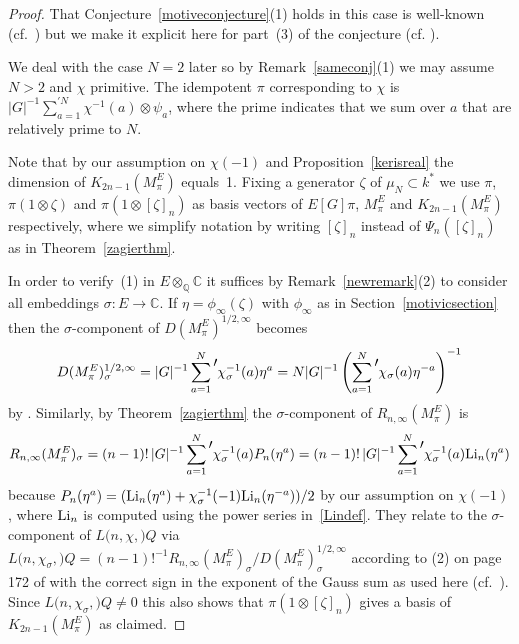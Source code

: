 \documentclass{amsart}
\begin{document}
\begin{proof}
That Conjecture~\ref{motiveconjecture}(1) holds in this case is well-known (cf.\ \cite{Neu88})
but we make it explicit here for part~(3) of the conjecture
(cf. \cite[Proposition~3.1]{Gro94}).

We deal with the case $ N=2 $ later so by Remark~\ref{sameconj}(1) we may assume $ N > 2 $
and $ \chi $ primitive. 
The idempotent $ \pi $ corresponding to $ \chi $ is
$ |G|^{-1} \sum_{a=1}^{\prime N} \chi^{-1}(a) {\otimes} \psi_a $, where the prime
indicates that we sum over $ a $ that are relatively prime to $ N $.

Note that by our assumption on $ \chi(-1) $ and Proposition~\ref{kerisreal} the dimension of $ K_{2n-1}(M_\pi^E) $ equals~1.
Fixing a generator $ {\zeta} $ of $ \mu_N \subset k^* $ we
use $ \pi $, $ \pi(1{\otimes}{\zeta}) $ and $ \pi(1{\otimes} [{\zeta}]_n) $
as basis vectors of $ E[G]\pi $, $ M_\pi^E $ and $ K_{2n-1}(M_\pi^E) $ respectively, where we simplify
notation by writing $ [{\zeta}]_n $ instead of $ \Psi_n([{\zeta}]_n) $ as in Theorem~\ref{zagierthm}.

In order to verify~(1) in $ E{\otimes}_{\mathbb Q}{\mathbb C} $ it suffices
by Remark~\ref{newremark}(2) to consider all embeddings $ {\sigma}: E \to {\mathbb C} $.
If $ \eta=\phi_\infty({\zeta}) $ with $ \phi_\infty $ as in Section~\ref{motivicsection}
then the $ {\sigma} $-component  of $ D(M_\pi^E)^{1/2,\infty} $ becomes
\begin{equation*}
D(M_\pi^E)^{1/2,\infty}_{\sigma}
=
|G|^{-1} \sum_{a=1}^N \raise7pt\hbox{$\prime$} \chi_{\sigma}^{-1}(a) \eta^a
=
N |G|^{-1} \left(\sum_{a=1}^N \raise7pt\hbox{$\prime$} \chi_{\sigma}(a) \eta^{-a} \right) ^{-1}
\end{equation*}
by \cite[(3) on p.84]{Lan70}.
Similarly, by Theorem~\ref{zagierthm} the $ {\sigma} $-component of $ R_{n,\infty}(M_\pi^E) $ is
\begin{equation*}
R_{n,\infty}(M_\pi^E)_{\sigma}
=
(n-1)!\, |G|^{-1} \sum_{a=1}^N  \raise7pt\hbox{$\prime$} \chi_{\sigma}^{-1}(a) {P}_n(\eta^a)
=
(n-1)! \, |G|^{-1} \sum_{a=1}^N  \raise7pt\hbox{$\prime$} \chi_{\sigma}^{-1}(a) {\textup{Li}}_n(\eta^a)
\end{equation*}
because $ {P}_n(\eta^a) = ({\textup{Li}}_n(\eta^a)+\chi_{\sigma}^{-1}(-1){\textup{Li}}_n(\eta^{-a}))/2 $ by our assumption on $ \chi(-1) $,
where $ {\textup{Li}}_n $ is computed using the power series in~\eqref{Lindef}.
They relate to the $ {\sigma} $-component of $ {L(n,{\chi},{\mathbb)}Q} $ via
$ {L(n,{\chi_{\sigma}},{\mathbb)}Q} = (n-1)!^{-1} R_{n,\infty}(M_\pi^E)_{\sigma} / D(M_\pi^E)^{1/2,\infty}_{\sigma} $
according to (2) on page 172 of \cite{Col82}
with the correct sign in the exponent of the Gauss sum as used here
(cf.\ \cite[p.~421]{Zag91}).  Since $ {L(n,{\chi_{\sigma}},{\mathbb)}Q} \ne 0 $ this also shows that
$ \pi(1{\otimes} [{\zeta}]_n) $ gives a basis of $ K_{2n-1}(M_\pi^E) $
as claimed.


\end{proof}
\end{document}
